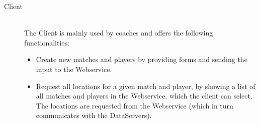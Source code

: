 \begin{description}
\item[Client] \hfill \\
The Client is mainly used by coaches and offers the following functionalities:
\begin{itemize}
    \item Create new matches and players by providing forms and sending the input to the Webservice.
    \item Request all locations for a given match and player, by showing a list of all matches and players in the Webservice, which the client can select. The locations are requested from the Webservice (which in turn communicates with the DataServers).
\end{itemize}
\end{description}